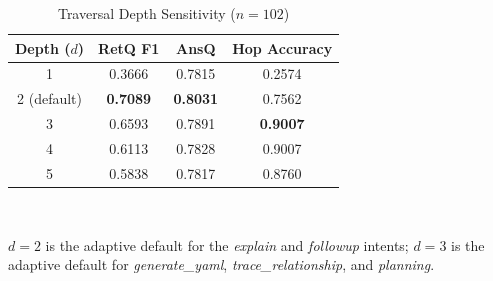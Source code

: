 \begin{table}[t]
\caption{Traversal Depth Sensitivity ($n=102$)}
\label{tbl:depth}
\centering
\begin{tabular}{|c|c|c|c|}
\hline
\textbf{Depth ($d$)} & \textbf{RetQ F1} & \textbf{AnsQ} & \textbf{Hop Accuracy} \\
\hline
1 & 0.3666 & 0.7815 & 0.2574 \\
\hline
2 (default) & \textbf{0.7089} & \textbf{0.8031} & 0.7562 \\
\hline
3 & 0.6593 & 0.7891 & \textbf{0.9007} \\
\hline
4 & 0.6113 & 0.7828 & 0.9007 \\
\hline
5 & 0.5838 & 0.7817 & 0.8760 \\
\hline
\end{tabular}
\\[4pt]
{\footnotesize \raggedright $d=2$ is the adaptive default for the \textit{explain} and \textit{followup} intents; $d=3$ is the adaptive default for \textit{generate\_yaml}, \textit{trace\_relationship}, and \textit{planning}.\par}
\end{table}
